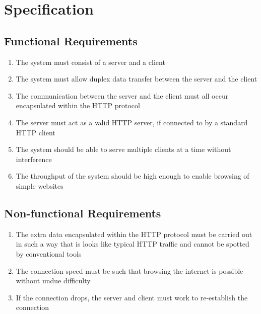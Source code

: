 \section{Specification}
\subsection{Functional Requirements}
\begin{enumerate}
    \item The system must consist of a server and a client
    \item The system must allow duplex data transfer between the server and the client
    \item The communication between the server and the client must all occur encapsulated within the HTTP protocol
    \item The server must act as a valid HTTP server, if connected to by a standard HTTP client
    \item The system should be able to serve multiple clients at a time without interference
    \item The throughput of the system should be high enough to enable browsing of simple websites
\end{enumerate}
\subsection{Non-functional Requirements}
\begin{enumerate}
    \item The extra data encapsulated within the HTTP protocol must be carried out in such a way that is looks like typical HTTP traffic and cannot be spotted by conventional tools
    \item The connection speed must be such that browsing the internet is possible without undue difficulty
    \item If the connection drops, the server and client must work to re-establish the connection
\end{enumerate}


